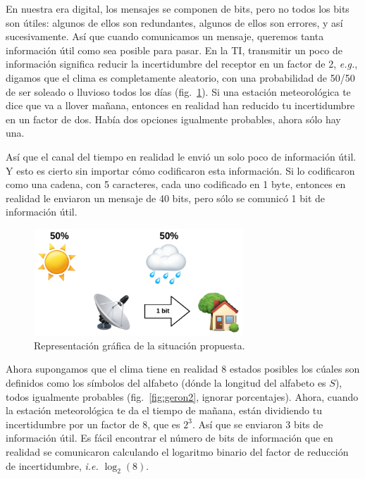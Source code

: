 \documentclass[a4paper,12pt]{article}
\begin{document}
En nuestra era digital, los mensajes se componen de bits, pero no todos los bits son útiles: algunos de ellos son redundantes, algunos de ellos son errores, y así sucesivamente. Así que cuando comunicamos un mensaje, queremos tanta información útil como sea posible para pasar. En la TI, transmitir un poco de información significa reducir la incertidumbre del receptor en un factor de 2, \textit{e.g.}, digamos que el clima es completamente aleatorio, con una probabilidad de 50/50 de ser soleado o lluvioso todos los días (fig.~\ref{fig:geron1}). Si una estación meteorológica te dice que va a llover mañana, entonces en realidad han reducido tu incertidumbre en un factor de dos. Había dos opciones igualmente probables, ahora sólo hay una. \citep{Geron2018Feb}

Así que el canal del tiempo en realidad le envió un solo poco de información útil. Y esto es cierto sin importar cómo codificaron esta información. Si lo codificaron como una cadena, con 5 caracteres, cada uno codificado en 1 byte, entonces en realidad le enviaron un mensaje de 40 bits, pero sólo se comunicó 1 bit de información útil.

\begin{figure}[H]
	\begin{center}
	\includegraphics[width=0.7\textwidth]{geron_1.png}
  	\caption{Representación gráfica de la situación propuesta.}
  	\label{fig:geron1}
  	\end{center}
\end{figure}

Ahora supongamos que el clima tiene en realidad 8 estados posibles los cúales son definidos como los símbolos del alfabeto (dónde la longitud del alfabeto es $S$), todos igualmente probables (fig.~\ref{fig:geron2}, ignorar porcentajes). Ahora, cuando la estación meteorológica te da el tiempo de mañana, están dividiendo tu incertidumbre por un factor de 8, que es $2^3$. Así que se enviaron 3 bits de información útil. Es fácil encontrar el número de bits de información que en realidad se comunicaron calculando el logaritmo binario del factor de reducción de incertidumbre, \textit{i.e.} $\log_2(8)$.
\end{document}
